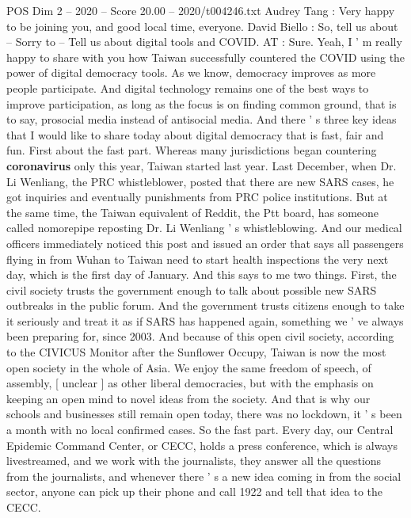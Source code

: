 \begin{textsample}{POS Dim 2 – 2020 – Score 20.00 – 2020/t004246.txt}  \label{ex:f2_pos_011}
Audrey Tang : Very happy to be joining you, and good local time, everyone.
David Biello : So, tell us about -- Sorry to -- Tell us about digital tools and COVID.
AT : Sure.
Yeah, I ' m really happy to share with you how Taiwan successfully countered the COVID using the power of digital democracy tools.
As we know, democracy improves as more people participate.
And digital technology remains one of the best ways to improve participation, as long as the focus is on finding common ground, that is to say, prosocial media instead of antisocial media.
And there ' s three key ideas that I would like to share today about digital democracy that is fast, fair and fun.
First about the fast part.
Whereas many jurisdictions began countering \textbf{coronavirus} only this year, Taiwan started last year.
Last December, when Dr.
Li Wenliang, the PRC whistleblower, posted that there are new SARS cases, he got inquiries and eventually punishments from PRC police institutions.
But at the same time, the Taiwan equivalent of Reddit, the Ptt board, has someone called nomorepipe reposting Dr.
Li Wenliang ' s whistleblowing.
And our medical officers immediately noticed this post and issued an order that says all passengers flying in from Wuhan to Taiwan need to start health inspections the very next day, which is the first day of January.
And this says to me two things.
First, the civil society trusts the government enough to talk about possible new SARS outbreaks in the public forum.
And the government trusts citizens enough to take it seriously and treat it as if SARS has happened again, something we ' ve always been preparing for, since 2003.
And because of this open civil society, according to the CIVICUS Monitor after the Sunflower Occupy, Taiwan is now the most open society in the whole of Asia.
We enjoy the same freedom of speech, of assembly, [ unclear ] as other liberal democracies, but with the emphasis on keeping an open mind to novel ideas from the society.
And that is why our schools and businesses still remain open today, there was no lockdown, it ' s been a month with no local confirmed cases.
So the fast part.
Every day, our Central Epidemic Command Center, or CECC, holds a press conference, which is always livestreamed, and we work with the journalists, they answer all the questions from the journalists, and whenever there ' s a new idea coming in from the social sector, anyone can pick up their phone and call 1922 and tell that idea to the CECC.

\end{textsample}
